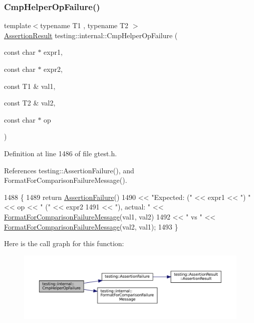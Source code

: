 \subsubsection{\texorpdfstring{Cmp\+Helper\+Op\+Failure()}{CmpHelperOpFailure()}}
{\footnotesize\ttfamily template$<$typename T1 , typename T2 $>$ \\
\hyperlink{classtesting_1_1AssertionResult}{Assertion\+Result} testing\+::internal\+::\+Cmp\+Helper\+Op\+Failure (\begin{DoxyParamCaption}\item[{const char $\ast$}]{expr1,  }\item[{const char $\ast$}]{expr2,  }\item[{const T1 \&}]{val1,  }\item[{const T2 \&}]{val2,  }\item[{const char $\ast$}]{op }\end{DoxyParamCaption})}



Definition at line 1486 of file gtest.\+h.



References testing\+::\+Assertion\+Failure(), and Format\+For\+Comparison\+Failure\+Message().


\begin{DoxyCode}
1488                                                    \{
1489   \textcolor{keywordflow}{return} \hyperlink{namespacetesting_a6bdf82adf159dcda822d75746937ffa9}{AssertionFailure}()
1490          << \textcolor{stringliteral}{"Expected: ("} << expr1 << \textcolor{stringliteral}{") "} << op << \textcolor{stringliteral}{" ("} << expr2
1491          << \textcolor{stringliteral}{"), actual: "} << \hyperlink{namespacetesting_1_1internal_a91ab078f10adc669f09b7f604975c518}{FormatForComparisonFailureMessage}(val1, val2)
1492          << \textcolor{stringliteral}{" vs "} << \hyperlink{namespacetesting_1_1internal_a91ab078f10adc669f09b7f604975c518}{FormatForComparisonFailureMessage}(val2, val1);
1493 \}
\end{DoxyCode}
Here is the call graph for this function\+:
\nopagebreak
\begin{figure}[H]
\begin{center}
\leavevmode
\includegraphics[width=350pt]{namespacetesting_1_1internal_a894ffccd936d78fd555f490020c27f0a_cgraph}
\end{center}
\end{figure}
\mbox{\label{namespacetesting_1_1internal_a30dfeb01f1bc8087c7d05205d5fa75c1}} 
